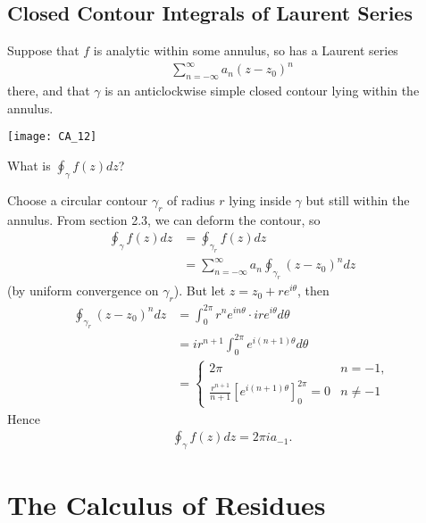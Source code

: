 \documentclass[a4paper]{article}
\begin{document}
\subsection{Closed Contour Integrals of Laurent Series}

Suppose that $f$ is analytic within some annulus, so has a Laurent series
\begin{equation*}
\begin{aligned}
\sum_{n=-\infty}^\infty a_n (z-z_0)^n
\end{aligned}
\end{equation*}
there, and that $\gamma$ is an anticlockwise simple closed contour lying within the annulus.

\texttt{[image: CA\_12]}

What is $\oint_\gamma f(z) dz$?

Choose a circular contour $\gamma_r$ of radius $r$ lying inside $\gamma$ but still within the annulus. From section 2.3, we can deform the contour, so
\begin{equation*}
\begin{aligned}
\oint_\gamma f(z) dz &= \oint_{\gamma_r} f(z) dz\\
&= \sum_{n=-\infty}^\infty a_n \oint_{\gamma_r} (z-z_0)^n dz
\end{aligned}
\end{equation*}
(by uniform convergence on $\gamma_r$). But let $z=z_0+re^{i\theta}$, then
\begin{equation*}
\begin{aligned}
\oint_{\gamma_r} (z-z_0)^n dz &= \int_0^{2\pi} r^n e^{in\theta} \cdot ire^{i\theta} d\theta\\
&= ir^{n+1} \int_0^{2\pi} e^{i(n+1)\theta} d\theta\\
&= \left\{\begin{array}{ll}
2\pi & n =-1,\\
\frac{r^{n+1}}{n+1} [e^{i(n+1)\theta} ]^{2\pi}_0 = 0 & n \neq -1
\end{array}\right.
\end{aligned}
\end{equation*}
Hence
\begin{equation*}
\begin{aligned}
\oint_\gamma f(z) dz = 2\pi i a_{-1}.
\end{aligned}
\end{equation*}

\newpage

\section{The Calculus of Residues}
\end{document}
